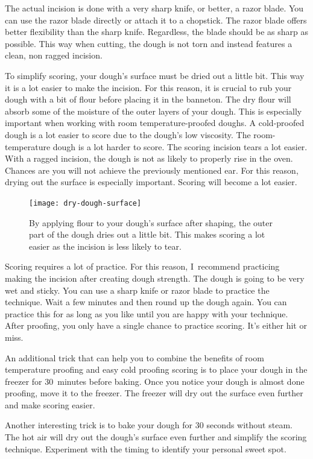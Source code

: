 The actual incision is done with a very sharp knife, or better, a razor
blade. You can use the razor blade directly or attach it to a chopstick.
The razor blade offers better flexibility than the sharp knife.
Regardless, the blade should be as sharp as possible. This way when cutting,
the dough is not torn and instead features a clean, non ragged incision.

To simplify scoring, your dough's surface must be dried out a little bit.
This way it is a lot easier to make the incision.
For this reason, it is crucial to rub your dough with a bit of flour
before placing it in the banneton. The dry flour will absorb some of the
moisture of the outer layers of your dough. This is especially important
when working with room temperature-proofed doughs. A cold-proofed dough
is a lot easier to score due to the dough's low viscosity. The room-temperature
dough is a lot harder to score. The scoring incision tears a lot
easier. With a ragged incision, the dough is not as likely to properly
rise in the oven. Chances are you will not achieve the previously mentioned
ear. For this reason, drying out the surface is especially important. Scoring
will become a lot easier.

\begin{figure}[htb!]
  \texttt{[image: dry-dough-surface]}
  \caption[Drying the dough surface]{By applying flour to your dough's surface
      after shaping, the outer part of the dough dries out a little bit. This
      makes scoring a lot easier as the incision is less likely to tear.}%
  \label{fig:dried-out-dough-scoring}
\end{figure}


Scoring requires a lot of practice. For this reason, I~recommend
practicing making the incision after creating dough strength. The dough
is going to be very wet and sticky. You can use a sharp knife or razor
blade to practice the technique. Wait a few minutes and then round
up the dough again. You can practice this for as long as you like
until you are happy with your technique. After proofing, you only
have a single chance to practice scoring. It's either hit or miss.

An additional trick that can help you to combine the benefits
of room temperature proofing and easy cold proofing scoring
is to place your dough in the freezer for 30~minutes before baking.
Once you notice your dough is almost done proofing, move it to the
freezer. The freezer will dry out the surface even further and make
scoring easier.

Another interesting trick is to bake your dough for 30 seconds without steam.
The hot air will dry out the dough's surface even further and simplify
the scoring technique. Experiment with the timing to identify your personal
sweet spot.
